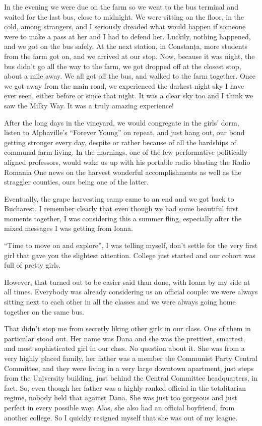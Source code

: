 \documentclass[12pt]{book}
\begin{document}
In the evening we were due on the farm so we went to the bus terminal
and waited for the last bus, close to midnight. We were sitting on the
floor, in the cold, among strangers, and I seriously dreaded what would
happen if someone were to make a pass at her and I had to defend her.
Luckily, nothing happened, and we got on the bus safely. At the next
station, in Constanța, more students from the farm got on, and we
arrived at our stop. Now, because it was night, the bus didn't go all
the way to the farm, we got dropped off at the closest stop, about a
mile away. We all got off the bus, and walked to the farm together. Once
we got away from the main road, we experienced the darkest night sky I
have ever seen, either before or since that night. It was a clear sky
too and I think we saw the Milky Way. It was a truly amazing experience!

After the long days in the vineyard, we would congregate in the girls'
dorm, listen to Alphaville's ``Forever Young'' on repeat, and just hang
out, our bond getting stronger every day, despite or rather because of
all the hardships of communal farm living. In the mornings, one of the
few performative politically-aligned professors, would wake us up with
his portable radio blasting the Radio Romania One news on the harvest
wonderful accomplishments as well as the straggler counties, ours being
one of the latter.

Eventually, the grape harvesting camp came to an end and we got back to
Bucharest. I remember clearly that even though we had some beautiful
first moments together, I was considering this a summer fling,
especially after the mixed messages I was getting from Ioana.

``Time to move on and explore'', I was telling myself, don't settle for
the very first girl that gave you the slightest attention. College just
started and our cohort was full of pretty girls.

However, that turned out to be easier said than done, with Ioana by my
side at all times. Everybody was already considering us an official
couple: we were always sitting next to each other in all the classes and
we were always going home together on the same bus.

That didn't stop me from secretly liking other girls in our class. One
of them in particular stood out. Her name was Dana and she was the
prettiest, smartest, and most sophisticated girl in our class. No
question about it. She was from a very highly placed family, her father
was a member the Communist Party Central Committee, and they were living
in a very large downtown apartment, just steps from the University
building, just behind the Central Committee headquarters, in fact. So,
even though her father was a highly ranked official in the totalitarian
regime, nobody held that against Dana. She was just too gorgeous and
just perfect in every possible way. Alas, she also had an official
boyfriend, from another college. So I quickly resigned myself that she
was out of my league.
\end{document}
